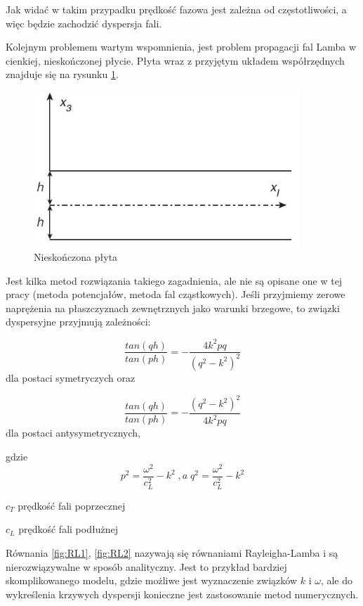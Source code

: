 Jak widać w takim przypadku prędkość fazowa jest zależna od częstotliwości, a więc będzie zachodzić dyspersja fali.

\vspace{3mm}

Kolejnym problemem wartym wspomnienia, jest problem propagacji fal Lamba w cienkiej, nieskończonej płycie. Płyta wraz z przyjętym układem współrzędnych znajduje się na rysunku \ref{fig:nieskonczona_plyta}.

\begin{figure}[h]
\centering
\includegraphics[width=10cm]{Zdjecia/2/dyspersja_analitycznie_plyta}
\caption{Nieskończona płyta \cite{bartek_rose}}
\label{fig:nieskonczona_plyta}
\end{figure}

Jest kilka metod rozwiązania takiego zagadnienia, ale nie są opisane one w tej pracy (metoda potencjałów, metoda fal cząstkowych). Jeśli przyjmiemy zerowe naprężenia na płaszczyznach zewnętrznych jako warunki brzegowe, to związki dyspersyjne przyjmują zależności:

\begin{equation}\label{fig:RL1}
\frac{tan(qh)}{tan(ph)}=-\frac{4k^2pq}{(q^2-k^2)^2}
\end{equation}
dla postaci symetryczych oraz

\begin{equation}\label{fig:RL2}
\frac{tan(qh)}{tan(ph)}=-\frac{(q^2-k^2)^2}{4k^2pq}
\end{equation}
dla postaci antysymetrycznych,

gdzie
\begin{equation}
p^2=\frac{\omega^2}{c_L^2} - k^2 \; ,a \; q^2=\frac{\omega^2}{c_L^2}-k^2
\end{equation}

\begin{eqwhere}[2cm]
        \item[$c_T$] prędkość fali poprzecznej
	\item[$c_L$] prędkość fali podłużnej
\end{eqwhere}

Równania \ref{fig:RL1}, \ref{fig:RL2} nazywają się równaniami Rayleigha-Lamba i są nierozwiązywalne w sposób analityczny. Jest to przykład bardziej skomplikowanego modelu, gdzie możliwe jest wyznaczenie związków \(k\) i \(\omega\), ale do wykreślenia krzywych dyspersji konieczne jest zastosowanie metod numerycznych.

